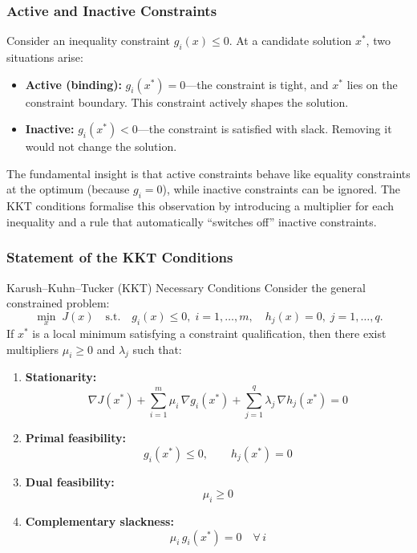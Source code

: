 \subsubsection{Active and Inactive Constraints}

Consider an inequality constraint $g_i(x) \le 0$. At a candidate solution $x^*$, two situations arise:
\begin{itemize}
	\item \textbf{Active (binding):} $g_i(x^*) = 0$---the constraint is tight, and $x^*$ lies on the constraint boundary. This constraint actively shapes the solution.
	\item \textbf{Inactive:} $g_i(x^*) < 0$---the constraint is satisfied with slack. Removing it would not change the solution.
\end{itemize}
The fundamental insight is that active constraints behave like equality constraints at the optimum (because $g_i = 0$), while inactive constraints can be ignored. The KKT conditions formalise this observation by introducing a multiplier for each inequality and a rule that automatically ``switches off'' inactive constraints.


\subsubsection{Statement of the KKT Conditions}

\begin{defnbox}{Karush--Kuhn--Tucker (KKT) Necessary Conditions}
	Consider the general constrained problem:
	\[
	\min_{x}\; J(x) \quad \text{s.t.} \quad g_i(x) \le 0,\; i=1,\ldots,m, \quad h_j(x) = 0,\; j=1,\ldots,q.
	\]
	If $x^*$ is a local minimum satisfying a constraint qualification, then there exist multipliers $\mu_i \ge 0$ and $\lambda_j$ such that:
	\begin{enumerate}
		\item \textbf{Stationarity:}
		\[
		\nabla J(x^*) + \sum_{i=1}^{m} \mu_i \,\nabla g_i(x^*) + \sum_{j=1}^{q} \lambda_j \,\nabla h_j(x^*) = 0
		\]
		\item \textbf{Primal feasibility:}
		\[
		g_i(x^*) \le 0, \qquad h_j(x^*) = 0
		\]
		\item \textbf{Dual feasibility:}
		\[
		\mu_i \ge 0
		\]
		\item \textbf{Complementary slackness:}
		\[
		\mu_i \, g_i(x^*) = 0 \quad \forall\, i
		\]
	\end{enumerate}
\end{defnbox}

